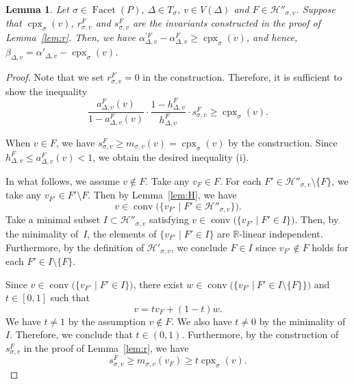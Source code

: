 \documentclass[11pt]{article}
\newtheorem{lem}[theo]{Lemma}
\theoremstyle{definition}
\numberwithin{equation}{section}
\begin{document}
\begin{lem}\label{lem:rsineq}
Let $\sigma \in \operatorname{Facet}(P)$, $\Delta \in T_{\sigma}$, $v \in V(\Delta)$ and $F \in \mathcal{H}'' _{\sigma, v}$. 
Suppose that $\operatorname{cpx}_{\sigma}(v)$, $r_{\sigma, v}^F$ and $s_{\sigma, v}^F$ are the invariants constructed in the proof of Lemma~\ref{lem:r}. 
Then, we have 
$\alpha ^{\prime F} _{\Delta, v} - \alpha ^{F} _{\Delta, v} \ge \operatorname{cpx}_{\sigma}(v)$, 
and hence, $\beta_{\Delta, v} = \alpha ' _{\Delta, v} - \operatorname{cpx}_{\sigma}(v)$. 
\end{lem}
\begin{proof}
Note that we set $r_{\sigma, v}^F = 0$ in the construction. Therefore, it is sufficient to show the inequality
\[\tag{i}
\frac{a_{\Delta,v}^F(v)}{1-a^F _{\Delta,v}(v)} \cdot \frac{1 - h^F _{\Delta,v}}{h^F _{\Delta,v}} 
\cdot s_{\sigma, v}^F  \ge \operatorname{cpx}_{\sigma}(v). 
\]


When $v \in F$, we have $s_{\sigma, v}^F \ge m_{\sigma,v}(v) = \operatorname{cpx}_{\sigma}(v)$ by the construction. 
Since $h_{\Delta, v} ^F \le a_{\Delta, v} ^F (v) <1$, we obtain the desired inequality (i). 

In what follows, we assume $v \not\in F$. 
Take any $v_F \in F$. 
For each $F' \in \mathcal{H}'' _{\sigma, v} \setminus \{ F \}$, we take any $v_{F'} \in F' \setminus F$. 
Then by Lemma~\ref{lem:H}, we have 
\[
v \in \operatorname{conv} \bigl( \{ v_{F'} \mid F' \in \mathcal{H}'' _{\sigma, v} \}  \bigr). 
\]
Take a minimal subset $I \subset \mathcal{H}'' _{\sigma, v}$ satisfying $v \in \operatorname{conv} \bigl( \{ v_{F'} \mid F' \in I \}  \bigr)$. 
Then, by the minimality of~$I$, the elements of $\{ v_{F'} \mid F' \in I \}$ are $\mathbb{R}$-linear independent. 
Furthermore, by the definition of $\mathcal{H}' _{\sigma, v}$, we conclude $F \in I$ since $v_{F'} \not \in F$ holds for each $F' \in I \setminus \{ F \}$. 

Since  $v \in \operatorname{conv} \bigl( \{ v_{F'} \mid F' \in I \}  \bigr)$, 
there exist $w \in \operatorname{conv} \bigl( \bigl\{ v_{F'} \ \big | \  F' \in I \setminus \{ F \} \bigr\}  \bigr)$ and $t \in [0,1]$ 
such that 
\[
v = t v_F + (1-t) w. 
\]
We have $t \ne 1$ by the assumption $v \not\in F$. 
We also have $t \ne 0$ by the minimality of~$I$. 
Therefore, we conclude that $t \in (0,1)$. 
Furthermore, by the construction of $s_{\sigma, v}^F$ in the proof of Lemma~\ref{lem:r}, we have 
\[\tag{ii}
s_{\sigma, v}^F \ge m_{\sigma,v}(v_F) \ge t\operatorname{cpx}_{\sigma}(v). 
\]


\end{proof}
\end{document}
